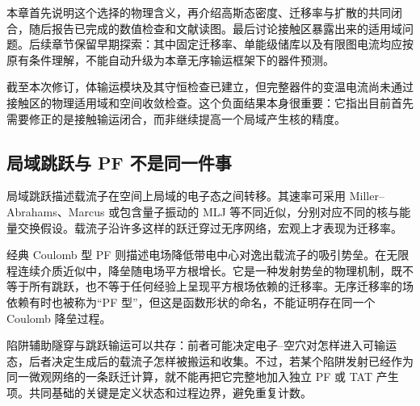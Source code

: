 \documentclass[11pt,a4paper]{article}
\begin{document}
{\cjkfont 本章首先说明这个选择的物理含义，再介绍高斯态密度、迁移率与扩散的共同闭合，随后报告已完成的数值检查和文献读图。最后讨论接触区暴露出来的适用域问题。后续章节保留早期探索：其中固定迁移率、单能级储库以及有限图电流均应按原有条件理解，不能自动升级为本章无序输运框架下的器件预测。}\allowbreak{}

{\cjkfont 截至本次修订，体输运模块及其守恒检查已建立，但完整器件的变温电流尚未通过接触区的物理适用域和空间收敛检查。这个负面结果本身很重要：它指出目前首先需要修正的是接触输运闭合，而非继续提高一个局域产生核的精度。}\allowbreak{}

\subsection{{\cjkfont 局域跳跃与}\allowbreak{} PF {\cjkfont 不是同一件事}\allowbreak{}}
{\cjkfont 局域跳跃描述载流子在空间上局域的电子态之间转移。其速率可采用}\allowbreak{} Miller--Abrahams{\cjkfont 、}\allowbreak{}Marcus {\cjkfont 或包含量子振动的}\allowbreak{} MLJ {\cjkfont 等不同近似，分别对应不同的核与能量交换假设。载流子沿许多这样的跃迁穿过无序网络，宏观上才表现为迁移率。}\allowbreak{}

{\cjkfont 经典}\allowbreak{} Coulomb {\cjkfont 型}\allowbreak{} PF {\cjkfont 则描述电场降低带电中心对逸出载流子的吸引势垒。在无限程连续介质近似中，降垒随电场平方根增长。它是一种发射势垒的物理机制，既不等于所有跳跃，也不等于任何经验上呈现平方根场依赖的迁移率。无序迁移率的场依赖有时也被称为}\allowbreak{}“PF {\cjkfont 型}\allowbreak{}”{\cjkfont ，但这是函数形状的命名，不能证明存在同一个}\allowbreak{} Coulomb {\cjkfont 降垒过程。}\allowbreak{}

{\cjkfont 陷阱辅助隧穿与跳跃输运可以共存：前者可能决定电子}\allowbreak{}--{\cjkfont 空穴对怎样进入可输运态，后者决定生成后的载流子怎样被搬运和收集。不过，若某个陷阱发射已经作为同一微观网络的一条跃迁计算，就不能再把它完整地加入独立}\allowbreak{} PF {\cjkfont 或}\allowbreak{} TAT {\cjkfont 产生项。共同基础的关键是定义状态和过程边界，避免重复计数。}\allowbreak{}
\end{document}
